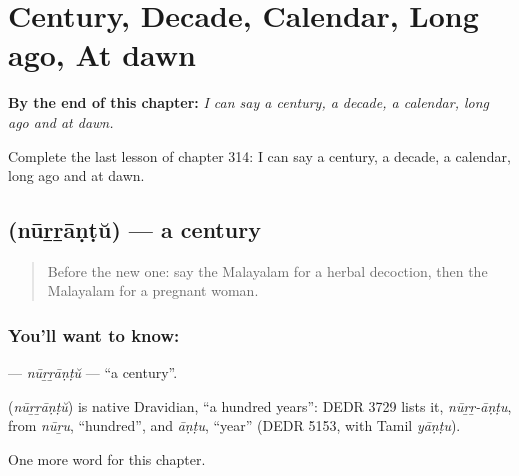 
\chapter{Century, Decade, Calendar, Long ago, At dawn}
\label{ch:ml-century-decade-calendar-long-ago-at-dawn}

\begin{chapteropening}
\textbf{By the end of this chapter:} \emph{I can say a century, a decade, a calendar, long ago and at dawn.}

Complete the last lesson of chapter 314: I can say a century, a decade, a calendar, long ago and at dawn.
\end{chapteropening}

\section[\texorpdfstring{\ml{നൂറ്റാണ്ട്} (nūṟṟāṇṭŭ)}{നൂറ്റാണ്ട് (nūṟṟāṇṭŭ)}]{ (nūṟṟāṇṭŭ) — a century}

\label{lesson:ML-C314-nurrantu}



\begin{quote}
Before the new one: say the Malayalam for a herbal decoction, then the Malayalam for a pregnant woman.
\end{quote}

\subsection*{You'll want to know: }
\textbf{} — \emph{nūṟṟāṇṭŭ} — \textquotedblleft{}a century\textquotedblright{}.

\begin{cousinweb}
\textbf{} (\emph{nūṟṟāṇṭŭ}) is native Dravidian, \textquotedblleft{}a hundred years\textquotedblright{}: DEDR 3729 lists it, \emph{nūṟṟ-āṇṭu}, from \emph{nūṟu}, \textquotedblleft{}hundred\textquotedblright{}, and \emph{āṇṭu}, \textquotedblleft{}year\textquotedblright{} (DEDR 5153, with Tamil \emph{yāṇṭu}).
\end{cousinweb}

\begin{grammarlens}[title={What you've built}]
One more word for this chapter.
\end{grammarlens}

